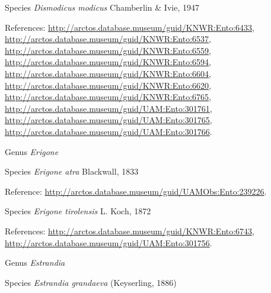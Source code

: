 \documentclass[9pt, article]{memoir}
\begin{document}
\begin{multicols}{2}
\vspace{6pt}\noindent\hspace{36pt}Species \textit{Dismodicus modicus} Chamberlin \& Ivie, 1947


\vspace{6pt}References: 
\url{http://arctos.database.museum/guid/KNWR:Ento:6433}, 
\url{http://arctos.database.museum/guid/KNWR:Ento:6537}, 
\url{http://arctos.database.museum/guid/KNWR:Ento:6559}, 
\url{http://arctos.database.museum/guid/KNWR:Ento:6594}, 
\url{http://arctos.database.museum/guid/KNWR:Ento:6604}, 
\url{http://arctos.database.museum/guid/KNWR:Ento:6620}, 
\url{http://arctos.database.museum/guid/KNWR:Ento:6765}, 
\url{http://arctos.database.museum/guid/UAM:Ento:301761}, 
\url{http://arctos.database.museum/guid/UAM:Ento:301765}, 
\url{http://arctos.database.museum/guid/UAM:Ento:301766}.

\vspace{6pt}\noindent\hspace{30pt}Genus \textit{Erigone}


\vspace{6pt}\noindent\hspace{36pt}Species \textit{Erigone atra} Blackwall, 1833


\vspace{6pt}Reference: 
\url{http://arctos.database.museum/guid/UAMObs:Ento:239226}.

\vspace{6pt}\noindent\hspace{36pt}Species \textit{Erigone tirolensis} L. Koch, 1872


\vspace{6pt}References: 
\url{http://arctos.database.museum/guid/KNWR:Ento:6743}, 
\url{http://arctos.database.museum/guid/UAM:Ento:301756}.

\vspace{6pt}\noindent\hspace{30pt}Genus \textit{Estrandia}


\vspace{6pt}\noindent\hspace{36pt}Species \textit{Estrandia grandaeva} (Keyserling, 1886)



\end{multicols}
\end{document}
